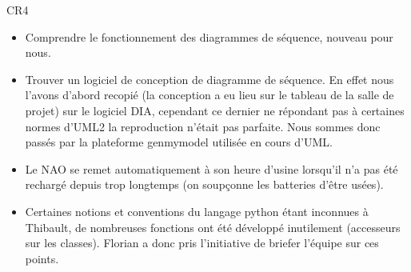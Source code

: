   \par CR4
  \begin{itemize}
    \item Comprendre le fonctionnement des diagrammes de séquence, nouveau pour nous.
    \item Trouver un logiciel de conception de diagramme de séquence.
    En effet nous l’avons d’abord recopié (la conception a eu lieu sur le tableau de la salle de projet) sur le logiciel DIA,
    cependant ce dernier ne répondant pas à certaines normes d’UML2 la reproduction n’était pas parfaite.
    Nous sommes donc passés par la plateforme genmymodel utilisée en cours d’UML.
    \item Le NAO se remet automatiquement à son heure d’usine lorsqu’il n’a pas été rechargé depuis trop longtemps (on soupçonne les batteries d’être usées).
    \item Certaines notions et conventions du langage python étant inconnues à Thibault, de nombreuses fonctions ont été développé inutilement (accesseurs sur les classes).
    Florian a donc pris l’initiative de briefer l’équipe sur ces points.\\
  \end{itemize}

